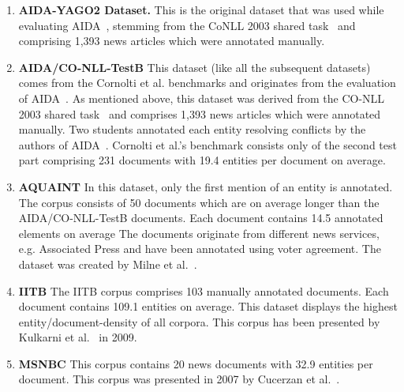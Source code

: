 \documentclass{llncs}
\begin{document}
\begin{enumerate}
\item \textbf{AIDA-YAGO2 Dataset.}
This is the original dataset that was used while evaluating AIDA~\cite{AIDA}, stemming from the CoNLL 2003 shared task~\cite{conll2003} and comprising 1,393 news articles which were annotated manually. %

\item  \textbf{AIDA/CO-NLL-TestB} This dataset (like all the subsequent datasets) comes from the Cornolti et al. benchmarks and originates from the evaluation of AIDA~\cite{AIDA}. 
As mentioned above, this dataset was derived from the CO-NLL 2003 shared task~\cite{conll2003} and comprises 1,393 news articles which were annotated manually. Two students annotated each entity resolving conflicts by the authors of AIDA~\cite{AIDA}. Cornolti et al.'s benchmark consists only of the second test part comprising 231 documents with 19.4 entities per document on average.

\item \textbf{AQUAINT} In this dataset, only the first mention of an entity is annotated. The corpus consists of 50 documents which are on average longer than the AIDA/CO-NLL-TestB documents. Each document contains 14.5 annotated elements on average
The documents originate from different news services, e.g. Associated Press and have been annotated using voter agreement.
The dataset was created by Milne et al.~\cite{milne2008learning}.

\item \textbf{IITB} The IITB corpus comprises 103 manually annotated documents. Each document contains 109.1 entities on average.
This dataset displays the highest entity/document-density of all corpora.
This corpus has been presented by Kulkarni et al.~\cite{kulkarni2009collective} in 2009.

\item \textbf{MSNBC} This corpus contains 20 news documents with 32.9 entities per document. This corpus was presented in 2007 by Cucerzan et al.~\cite{Cucerzan07}.
\end{enumerate}
\end{document}
